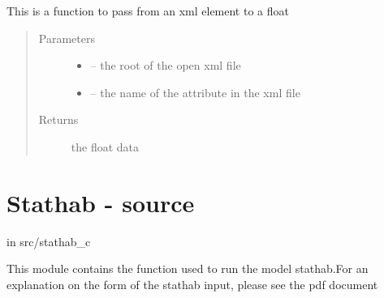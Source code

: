 \documentclass[letterpaper,10pt,english]{sphinxmanual}
\begin{document}
\begin{fulllineitems}
\label{\detokenize{index:src.estimhab.pass_to_float_estimhab}}
This is a function to pass from an xml element to a float
\begin{quote}\begin{description}
\item[{Parameters}] \leavevmode\begin{itemize}
\item {} 
 -- the root of the open xml file

\item {} 
 -- the name of the attribute in the xml file

\end{itemize}

\item[{Returns}] \leavevmode
the float data

\end{description}\end{quote}

\end{fulllineitems}



\section{Stathab - source}
\label{\detokenize{index:stathab-source}}
in src/stathab\_c

This module contains the function used to run the model stathab.For an explanation on
the form of the stathab input, please see the pdf document 
\label{\detokenize{index:module-src.stathab_c}}
\end{document}
